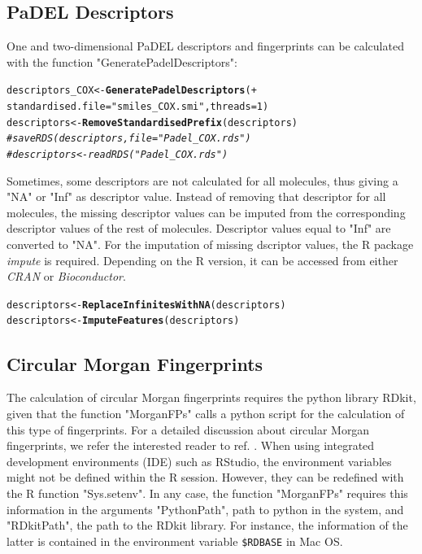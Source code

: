 \documentclass[twoside,a4wide,12pt]{article}\usepackage[]{graphicx}\usepackage[]{color}
\makeatletter
\newcommand{\hlstr}[1]{\textcolor[rgb]{0.192,0.494,0.8}{#1}}%
\newcommand{\hlcom}[1]{\textcolor[rgb]{0.678,0.584,0.686}{\textit{#1}}}%
\newcommand{\hlstd}[1]{\textcolor[rgb]{0.345,0.345,0.345}{#1}}%
\newcommand{\hlkwb}[1]{\textcolor[rgb]{0.69,0.353,0.396}{#1}}%
\newcommand{\hlkwd}[1]{\textcolor[rgb]{0.737,0.353,0.396}{\textbf{#1}}}%
\newenvironment{kframe}{%
 \def\at@end@of@kframe{}%
 \ifinner\ifhmode%
  \def\at@end@of@kframe{\end{minipage}}%
  \begin{minipage}{\columnwidth}%
 \fi\fi%
 \def\FrameCommand##1{\hskip\@totalleftmargin \hskip-\fboxsep
 \colorbox{shadecolor}{##1}\hskip-\fboxsep
     \hskip-\linewidth \hskip-\@totalleftmargin \hskip\columnwidth}%
 \MakeFramed {\advance\hsize-\width
   \@totalleftmargin\z@ \linewidth\hsize
   \@setminipage}}%
 {\par\unskip\endMakeFramed%
 \at@end@of@kframe}
\newenvironment{knitrout}{}{} %
\makeatother
\begin{document}
\subsection{PaDEL Descriptors}
One and two-dimensional PaDEL\cite{padel} descriptors and fingerprints can be calculated with the function "GeneratePadelDescriptors":
\begin{knitrout}
\color{fgcolor}\begin{kframe}
\begin{alltt}
descriptors_COX <- \hlkwd{GeneratePadelDescriptors}( +
  standardised.file=\hlstr{"smiles_COX.smi"},threads = 1)
descriptors <- \hlkwd{RemoveStandardisedPrefix}(descriptors)
\hlcom{#saveRDS(descriptors, file="Padel_COX.rds")}
\hlcom{#descriptors <- readRDS("Padel_COX.rds")}
\end{alltt}
\end{kframe}
\end{knitrout}


Sometimes, some descriptors are not calculated for all molecules, thus giving a "NA" or "Inf" as descriptor value.
Instead of removing that descriptor for all molecules, the missing descriptor values can be imputed from the corresponding descriptor values of the rest of molecules.
Descriptor values equal to "Inf" are converted to "NA".
For the imputation of missing dscriptor values, the R package {\it impute} is required.
Depending on the R version, it can be accessed from either {\it CRAN} or {\it Bioconductor}.

\begin{knitrout}
\color{fgcolor}\begin{kframe}
\begin{alltt}
\hlstd{descriptors} \hlkwb{<-} \hlkwd{ReplaceInfinitesWithNA}\hlstd{(descriptors)}
\hlstd{descriptors} \hlkwb{<-} \hlkwd{ImputeFeatures}\hlstd{(descriptors)}
\end{alltt}
\end{kframe}
\end{knitrout}


\subsection{Circular Morgan Fingerprints}
The calculation of circular Morgan fingerprints requires the python library RDkit, given that the function "MorganFPs" calls a python script for the calculation of this type of fingerprints.
For a detailed discussion about circular Morgan fingerprints, we refer
the interested reader to ref. \cite{morgan}.
When using integrated development environments (IDE) such as RStudio,
the environment variables might not be defined within the R session.
However, they can be redefined with the R function "Sys.setenv".
In any case, the function "MorganFPs" requires this information in the arguments "PythonPath", path to python in the system, and "RDkitPath", the path to the RDkit library. 
For instance, the information of the latter is contained in the environment variable \verb|$RDBASE| in Mac OS.
\end{document}
